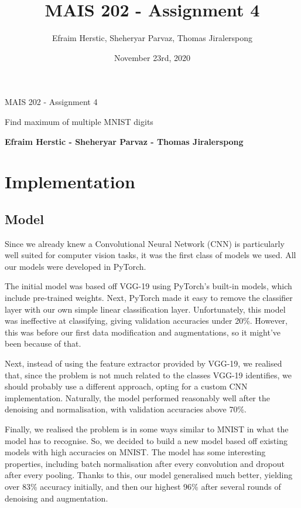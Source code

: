 \documentclass[12pt]{article}
\title{MAIS 202 - Assignment 4}
\author{Efraim Herstic, Sheheryar Parvaz, Thomas Jiralerspong}
\date{November 23rd, 2020}
\begin{document}
\begin{titlepage}
   \begin{center}
       \vspace*{1cm}

       {\Huge MAIS 202 - Assignment 4}
    
       \vspace{0.5cm}
        Find maximum of multiple MNIST digits
            
       \vspace{1.5cm}

       \textbf{Efraim Herstic - Sheheryar Parvaz - Thomas Jiralerspong}

            
   \end{center}
\end{titlepage}
\tableofcontents
\newpage

\section{Implementation}
\subsection{Model}
Since we already knew a Convolutional Neural Network (CNN) is
particularly well suited for computer vision tasks, it was the first
class of models we used. All our models were developed in PyTorch.

The initial model was based off VGG-19 using PyTorch's built-in
models\cite{torchvisionmodels}, which include pre-trained weights. Next,
PyTorch made it easy to remove the classifier layer with our own simple
linear classification layer. Unfortunately, this model was ineffective
at classifying, giving validation accuracies under 20\%. However, this
was before our first data modification and augmentations, so it might've
been because of that.

Next, instead of using the feature extractor provided by VGG-19, we
realised that, since the problem is not much related to the classes
VGG-19 identifies, we should probably use a different approach, opting
for a custom CNN implementation. Naturally, the model performed
reasonably well after the denoising and normalisation, with validation
accuracies above 70\%.

Finally, we realised the problem is in some ways similar to MNIST in
what the model has to recognise. So, we decided to build a new model
based off existing models with high accuracies on
MNIST\cite{kagglemnist}.  The model has some interesting properties,
including batch normalisation after every convolution and dropout after
every pooling. Thanks to this, our model generalised much better,
yielding over 83\% accuracy initially, and then our highest 96\% after
several rounds of denoising and augmentation.
\end{document}
